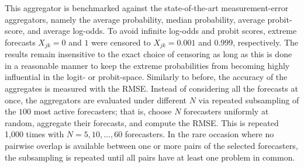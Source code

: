\documentclass[11pt]{article}
\theoremstyle{definition}
\theoremstyle{definition}
\def\one{{\bf 1}}
\begin{document}
This aggregator is benchmarked against the state-of-the-art measurement-error aggregators, namely the average probability, median probability, average probit-score, and average log-odds. To avoid infinite log-odds
and probit scores, extreme forecasts $X_{jk} = 0$ and $1$ were
censored to $X_{jk} = 0.001$ and $0.999$, respectively. The results remain insensitive to the exact choice of censoring as long as this is done in a reasonable manner to keep the extreme probabilities from becoming highly influential in the logit- or probit-space. Similarly to before, the accuracy of the aggregates is measured with the RMSE.
 Instead of considering all the forecasts at once, the aggregators are evaluated under different $N$ via repeated subsampling of the $100$ most active forecasters; that is, choose $N$ forecasters uniformly at random, aggregate their forecasts, and compute the RMSE. This is repeated 1,000 times with $N = 5, 10, \dots, 60$ forecasters. In the rare occasion where no pairwise overlap is available between one or more pairs of the selected forecasters, the subsampling is repeated until all pairs have at least one problem in common. 
\end{document}
